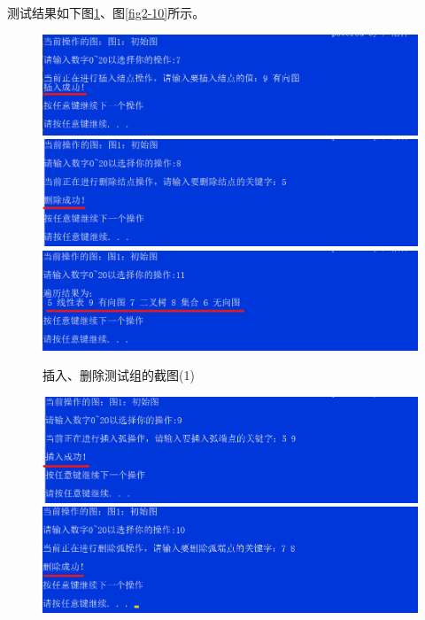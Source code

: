 \documentclass[supercite]{Experimental_Report}
\theoremstyle{definition}
\begin{document}
\begin{enumerate}
	测试结果如下图\ref{fig2-9}、图\ref{fig2-10}所示。
	\begin{figure}[htb] %
		\begin{center}
			\includegraphics[scale=0.6]{./images/图/2-7.png}
			\includegraphics[scale=0.6]{./images/图/2-8.png}
			\includegraphics[scale=0.6]{./images/图/2-11.png}
			\caption{插入、删除测试组的截图(1)}
			\label{fig2-9}
		\end{center}
	\end{figure}
	\begin{figure}[htb] %
		\begin{center}
			\includegraphics[scale=0.6]{./images/图/2-9.png}
			\includegraphics[scale=0.6]{./images/图/2-10.png}

\end{center}
\end{figure}
\end{enumerate}
\end{document}
